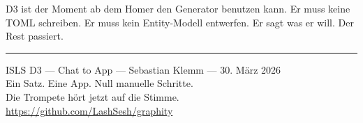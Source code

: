 \documentclass[11pt,a4paper]{article}
\begin{document}
D3 ist der Moment ab dem Homer den Generator benutzen kann.
Er muss keine TOML schreiben. Er muss kein Entity-Modell entwerfen.
Er sagt was er will. Der Rest passiert.

\vfill
\noindent\rule{\textwidth}{0.4pt}
\begin{center}
\small
ISLS D3 --- Chat to App --- Sebastian Klemm --- 30. M\"arz 2026\\
Ein Satz. Eine App. Null manuelle Schritte.\\
Die Trompete h\"ort jetzt auf die Stimme.\\
\url{https://github.com/LashSesh/graphity}
\end{center}
\end{document}
